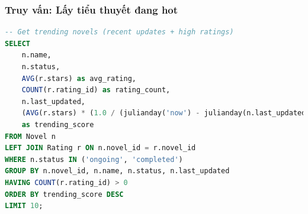 \documentclass[12pt,aspectratio=169,handout]{beamer}
\begin{document}
\begin{frame}[fragile]
\frametitle{Truy vấn: Lấy tiểu thuyết đang hot}
\begin{lstlisting}[language=SQL, basicstyle=\tiny\ttfamily]
-- Get trending novels (recent updates + high ratings)
SELECT 
    n.name, 
    n.status,
    AVG(r.stars) as avg_rating,
    COUNT(r.rating_id) as rating_count,
    n.last_updated,
    (AVG(r.stars) * (1.0 / (julianday('now') - julianday(n.last_updated) + 1))) 
    as trending_score
FROM Novel n
LEFT JOIN Rating r ON n.novel_id = r.novel_id
WHERE n.status IN ('ongoing', 'completed')
GROUP BY n.novel_id, n.name, n.status, n.last_updated
HAVING COUNT(r.rating_id) > 0
ORDER BY trending_score DESC
LIMIT 10;
\end{lstlisting}
\end{frame}
\end{document}
